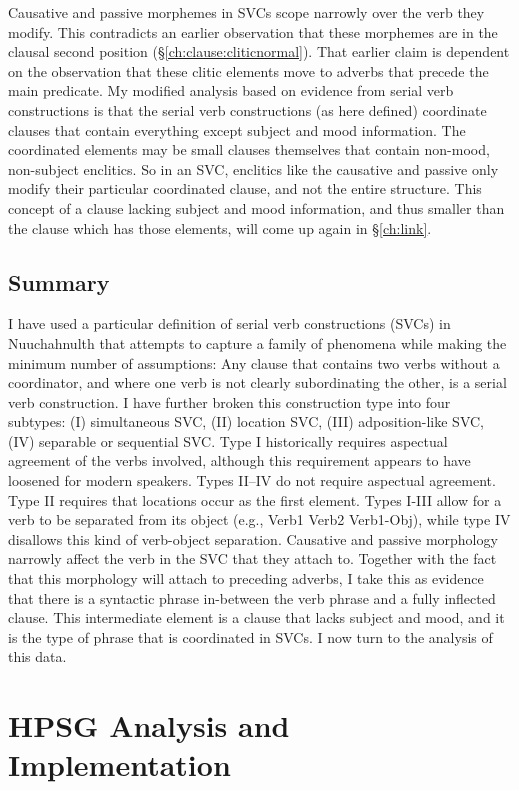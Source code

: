 Causative and passive morphemes in SVCs scope narrowly over the verb they modify. This contradicts an earlier observation that these morphemes are in the clausal second position (\S\ref{ch:clause:cliticnormal}). That earlier claim is dependent on the observation that these clitic elements move to adverbs that precede the main predicate. My modified analysis based on evidence from serial verb constructions is that the serial verb constructions (as here defined) coordinate clauses that contain everything except subject and mood information. The coordinated elements may be small clauses themselves that contain non-mood, non-subject enclitics. So in an SVC, enclitics like the causative and passive only modify their particular coordinated clause, and not the entire structure. This concept of a clause lacking subject and mood information, and thus smaller than the clause which has those elements, will come up again in \S\ref{ch:link}.

\subsection{Summary}

I have used a particular definition of serial verb constructions (SVCs) in Nuuchahnulth that attempts to capture a family of phenomena while making the minimum number of assumptions: Any clause that contains two verbs without a coordinator, and where one verb is not clearly subordinating the other, is a serial verb construction. I have further broken this construction type into four subtypes: (I) simultaneous SVC, (II) location SVC, (III) adposition-like SVC, (IV) separable or sequential SVC. Type I historically requires aspectual agreement of the verbs involved, although this requirement appears to have loosened for modern speakers. Types II--IV do not require aspectual agreement. Type II requires that locations occur as the first element. Types I-III allow for a verb to be separated from its object (e.g., Verb1 Verb2 Verb1-Obj), while type IV disallows this kind of verb-object separation. Causative and passive morphology narrowly affect the verb in the SVC that they attach to. Together with the fact that this morphology will attach to preceding adverbs, I take this as evidence that there is a syntactic phrase in-between the verb phrase and a fully inflected clause. This intermediate element is a clause that lacks subject and mood, and it is the type of phrase that is coordinated in SVCs. I now turn to the analysis of this data.

\section{HPSG Analysis and Implementation} \label{ch:sv:analysis}